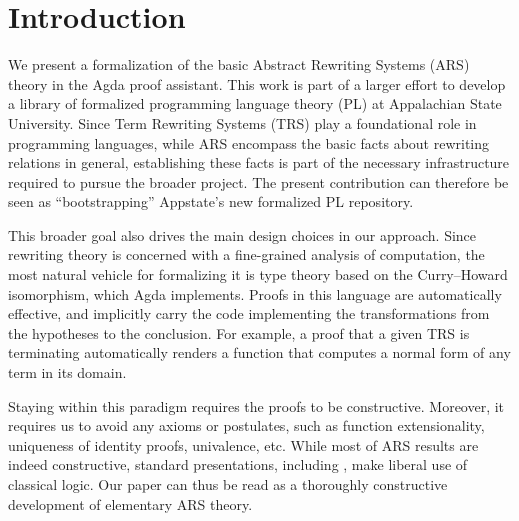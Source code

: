 \section{Introduction}
\label{sec:Introduction}

%


We present a formalization of the basic Abstract Rewriting Systems (ARS) theory in the Agda proof assistant.
This work is part of a larger effort to develop a library of formalized programming language theory (PL)
at Appalachian State University.
Since Term Rewriting Systems (TRS) play a foundational role in programming languages,
while ARS encompass the basic facts about rewriting relations in general,
establishing these facts is part of the necessary infrastructure required to
pursue the broader project.  The present contribution can therefore be seen as
``bootstrapping'' Appstate's new formalized PL repository.

This broader goal also drives the main design choices in our approach.
Since rewriting theory is concerned with a fine-grained analysis of computation,
the most natural vehicle for formalizing it is type theory based on the
Curry--Howard isomorphism, which Agda implements.  Proofs in this language
are automatically effective, and implicitly carry the code implementing the
transformations from the hypotheses to the conclusion.  For example,
a proof that a given TRS is terminating automatically renders a function that
computes a normal form of any term in its domain.

Staying within this paradigm requires the proofs to be constructive.
Moreover, it requires us to avoid any axioms or postulates, such as function
extensionality, uniqueness of identity proofs, univalence, etc.
While most of ARS results are indeed constructive, standard presentations,
 including \cite{Terese}, make liberal use of classical logic.
Our paper can thus be read as a thoroughly constructive
development of elementary ARS theory.

